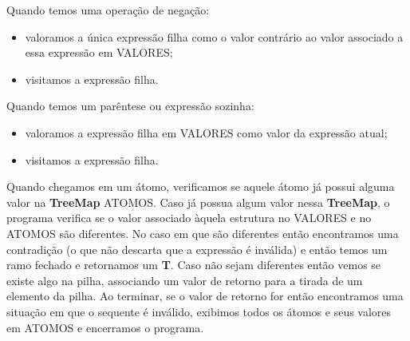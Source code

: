 \documentclass[12pt,letterpaper]{article}
\begin{document}
Quando temos uma operação de negação:
\begin{itemize}
	\item valoramos a única expressão filha como o valor contrário ao valor associado a essa expressão em VALORES;
	\item visitamos a expressão filha.
\end{itemize}

Quando temos um parêntese ou expressão sozinha:
\begin{itemize}
	\item valoramos a expressão filha em VALORES como valor da expressão atual;
	\item visitamos a expressão filha.
\end{itemize}

Quando chegamos em um átomo, verificamos se aquele átomo já possui alguma valor na \textbf{TreeMap} ATOMOS. Caso já possua algum valor nessa \textbf{TreeMap}, o programa verifica se o valor associado àquela estrutura no VALORES e no ATOMOS são diferentes. No caso em que são diferentes então encontramos uma contradição (o que não descarta que a expressão é inválida) e então temos um ramo fechado e retornamos um \textbf{T}. Caso não sejam diferentes então vemos se existe algo na pilha, associando um valor de retorno para a tirada de um elemento da pilha. Ao terminar, se o valor de retorno for  então encontramos uma situação em que o sequente é inválido, exibimos todos os átomos e seus valores em ATOMOS e encerramos o programa.
 
\end{document}
